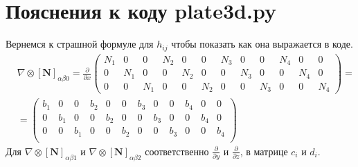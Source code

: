 \documentclass[a4paper,12pt]{article}
\begin{document}
\section{Пояснения к коду plate3d.py}
Вернемся к страшной формуле для $h_{ij}$ чтобы показать как она выражается в коде. 
\begin{align}
& \nabla \otimes [\textbf{N}]_{\alpha \beta 0} = \frac{\partial}{\partial x}
\begin{pmatrix}
N_1 & 0 & 0 & N_2 & 0 & 0 & N_3 & 0 & 0 & N_4 & 0 & 0 \\
0 & N_1 & 0 & 0 & N_2 & 0 & 0 & N_3 & 0 & 0 & N_4 & 0 \\
0 & 0 & N_1 & 0 & 0 & N_2 & 0 & 0 & N_3 & 0 & 0 & N_4
\end{pmatrix} = \\
&=\begin{pmatrix}
b_1 & 0   & 0   & b_2 & 0   & 0   & b_3 & 0   & 0   & b_4 & 0   & 0 \\
0   & b_1 & 0   & 0   & b_2 & 0   & 0   & b_3 & 0   & 0   & b_4 & 0 \\
0   & 0   & b_1 & 0   & 0   & b_2 & 0   & 0   & b_3 & 0   & 0   & b_4\\
\end{pmatrix}
\end{align}
Для $\nabla \otimes [\textbf{N}]_{\alpha \beta 1}$ и $\nabla \otimes [\textbf{N}]_{\alpha \beta 2}$ соответственно $\frac{\partial}{\partial y}$ и $\frac{\partial}{\partial z}$, в матрице $c_i$ и $d_i $. 
\end{document}
